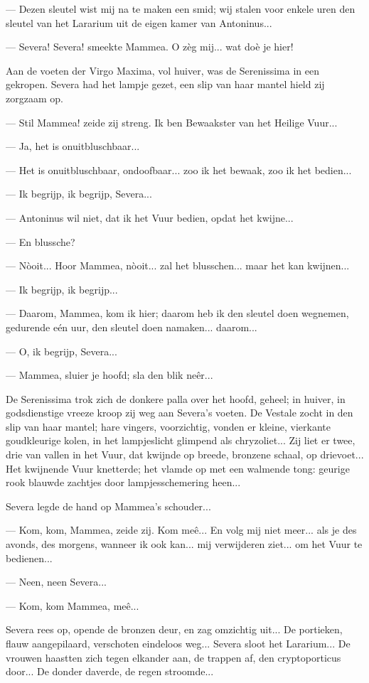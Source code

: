 \documentclass[a4paper, 12pt, oneside, dutch]{article}
\begin{document}
--- Dezen sleutel wist mij na te maken een smid; wij stalen voor enkele uren den sleutel van het Lararium uit de eigen kamer van Antoninus...

--- Severa! Severa! smeekte Mammea. O zèg mij... wat doè je hier!

Aan de voeten der Virgo Maxima, vol huiver, was de Serenissima in een gekropen. Severa had het lampje gezet, een slip van haar mantel hield zij zorgzaam op.

--- Stil Mammea! zeide zij streng. Ik ben Bewaakster van het Heilige Vuur...

--- Ja, het is onuitbluschbaar...

--- Het is onuitbluschbaar, ondoofbaar... zoo ik het bewaak, zoo ik het bedien...

--- Ik begrijp, ik begrijp, Severa...

--- Antoninus wil niet, dat ik het Vuur bedien, opdat het kwijne...

--- En blussche?

--- Nòoit... Hoor Mammea, nòoit... zal het blusschen... maar het kan kwijnen...

--- Ik begrijp, ik begrijp...

--- Daarom, Mammea, kom ik hier; daarom heb ik den sleutel doen wegnemen, gedurende eén uur, den sleutel doen namaken... daarom...

--- O, ik begrijp, Severa...

--- Mammea, sluier je hoofd; sla den blik neêr...

De Serenissima trok zich de donkere palla over het hoofd, geheel; in huiver, in godsdienstige vreeze kroop zij weg aan Severa's voeten. De Vestale zocht in den slip van haar mantel; hare vingers, voorzichtig, vonden er kleine, vierkante goudkleurige kolen, in het lampjeslicht glimpend als chryzoliet... Zij liet er twee, drie van vallen in het Vuur, dat kwijnde op breede, bronzene schaal, op drievoet... Het kwijnende Vuur knetterde; het vlamde op met een walmende tong: geurige rook blauwde zachtjes door lampjesschemering heen...

Severa legde de hand op Mammea's schouder...

--- Kom, kom, Mammea, zeide zij. Kom meê... En volg mij niet meer... als je des avonds, des morgens, wanneer ik ook kan... mij verwijderen ziet... om het Vuur te bedienen...

--- Neen, neen Severa...

--- Kom, kom Mammea, meê...

Severa rees op, opende de bronzen deur, en zag omzichtig uit... De portieken, flauw aangepilaard, verschoten eindeloos weg... Severa sloot het Lararium... De vrouwen haastten zich tegen elkander aan, de trappen af, den cryptoporticus door... De donder daverde, de regen stroomde...
\end{document}
